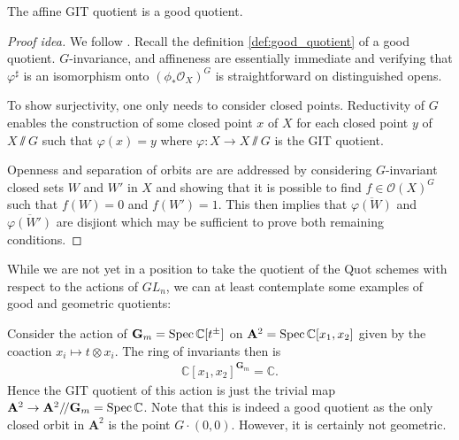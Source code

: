 \documentclass[12pt]{ociamthesis}  %
\begin{document}
\begin{theorem}\label{thm:affine_quotient_is_good}
  The affine GIT quotient is a good quotient.
  \begin{proof}[Proof idea]
    We follow \cite[Theorem 4.30]{hoskins2016}. Recall the definition
    \ref{def:good_quotient} of a good quotient. $G$-invariance,
    and affineness are essentially immediate and verifying that
    $\varphi^\sharp$ is an isomorphism onto $(\phi_*\mathscr O_X)^G$
    is straightforward on distinguished opens.

    To show surjectivity, one only needs to consider closed points.
    Reductivity of $G$ enables the construction of some closed point
    $x$ of $X$ for each closed point $y$ of $X\sslash G$ such that
    $\varphi(x) = y$ where $\varphi : X\to X\sslash G$ is the GIT quotient.

    Openness and separation of orbits are are addressed by considering
    $G$-invariant closed sets $W$ and $W'$ in $X$ and showing that
    it is possible to find $f\in\mathscr O(X)^G$ such that
    $f(W) = 0$ and $f(W') = 1$. \cite[Lemma 4.29]{hoskins2016}
    This then implies that $\overline{\varphi(W)}$ and $\overline{\varphi(W')}$
    are disjiont which may be sufficient to prove both remaining conditions.
  \end{proof}
\end{theorem}

While we are not yet in a position to take the quotient of the Quot
schemes with respect to the actions of $GL_n$,
we can at least contemplate some examples of good and geometric
quotients:

\begin{example}
  Consider the action of $\mathbf G_m = \operatorname{Spec}\mathbb C[t^\pm]$ on
  $\mathbf A^2 = \operatorname{Spec}\mathbb C[x_1, x_2]$ given by
  the coaction $x_i \mapsto t\otimes x_i$. The ring of
  invariants then is
  \begin{align*}
    \mathbb C[x_1,x_2]^{\mathbf G_m} = \mathbb C.
  \end{align*}
  Hence the GIT quotient of this action is just the
  trivial map $\mathbf A^2 \to \mathbf A^2 /\!/ \mathbf G_m = \operatorname{Spec}\mathbb C$. Note that this
  is indeed a good quotient as the only closed orbit in $\mathbf A^2$ is
  the point $G\cdot(0,0)$. However, it is certainly not geometric.
\end{example}
\end{document}
